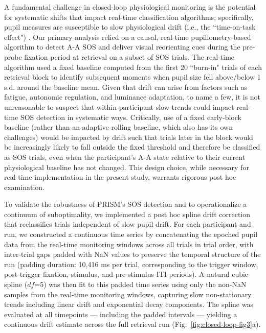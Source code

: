 A fundamental challenge in closed-loop physiological monitoring is the potential for systematic shifts that impact real-time classification algorithms; specifically, pupil measures are susceptible to slow physiological drift (i.e., the ``time-on-task effect") \parencite{unsworth2016pupillary,beatty1982phasic,hopstaken2015multifaceted,martin2022pupillometry,massar2016rewards,steinhauer2022publication,zhao2019pupillometry,schwartz2025eyeris,schwartz2025eyerispaper}. Our primary analysis relied on a causal, real-time pupillometry-based algorithm to detect A-A SOS and deliver visual reorienting cues during the pre-probe fixation period at retrieval on a subset of SOS trials. The real-time algorithm used a fixed baseline computed from the first 20 ``burn-in" trials of each retrieval block to identify subsequent moments when pupil size fell above/below 1 s.d. around the baseline mean. Given that drift can arise from factors such as fatigue, autonomic regulation, and luminance adaptation, to name a few, it is not unreasonable to suspect that within-participant slow trends could impact real-time SOS detection in systematic ways. Critically, use of a fixed early-block baseline (rather than an adaptive rolling baseline, which also has its own challenges) would be impacted by drift such that trials later in the block would be increasingly likely to fall outside the fixed threshold and therefore be classified as SOS trials, even when the participant's A-A state relative to their current physiological baseline has not changed. This design choice, while necessary for real-time implementation in the present study, warrants rigorous post hoc examination.

To validate the robustness of PRISM's SOS detection and to operationalize a continuum of suboptimality, we implemented a post hoc spline drift correction that reclassifies trials independent of slow pupil drift. For each participant and run, we constructed a continuous time series by concatenating the epoched pupil data from the real-time monitoring windows across all trials in trial order, with inter-trial gaps padded with NaN values to preserve the temporal structure of the run (padding duration: 10,416 ms per trial, corresponding to the trigger window, post-trigger fixation, stimulus, and pre-stimulus ITI periods). A natural cubic spline ($df$=5) was then fit to this padded time series using only the non-NaN samples from the real-time monitoring windows, capturing slow non-stationary trends including linear drift and exponential decay components. The spline was evaluated at all timepoints — including the padded intervals — yielding a continuous drift estimate across the full retrieval run (Fig.~\ref{fig:closed-loop-fig3}a). 

